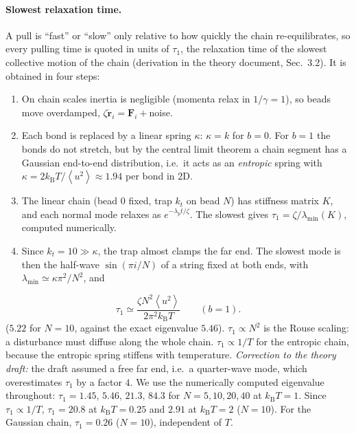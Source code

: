 \documentclass[11pt,a4paper]{article}
\newcommand{\kT}{k_{\mathrm B}T}
\newcommand{\avg}[1]{\left\langle #1\right\rangle}
\begin{document}
\paragraph{Slowest relaxation time.} A pull is ``fast'' or ``slow'' only relative to how quickly
the chain re-equilibrates, so every pulling time is quoted in units of $\tau_1$, the relaxation
time of the slowest collective motion of the chain (derivation in the theory document, Sec.~3.2).
It is obtained in four steps:
\begin{enumerate}[leftmargin=*,itemsep=0pt]
\item On chain scales inertia is negligible (momenta relax in $1/\gamma=1$), so beads move overdamped,
$\zeta\dot{\bm r}_i=\bm F_i+$noise.
\item Each bond is replaced by a linear spring $\kappa$: $\kappa=k$ for $b=0$. For $b=1$ the bonds do not
stretch, but by the central limit theorem a chain segment has a Gaussian end-to-end distribution, i.e.\
it acts as an \emph{entropic} spring with $\kappa=2\kT/\avg{u^2}\approx1.94$ per bond in 2D.
\item The linear chain (bead $0$ fixed, trap $k_t$ on bead $N$) has stiffness matrix $K$, and each normal
mode relaxes as $e^{-\lambda_pt/\zeta}$. The slowest gives $\tau_1=\zeta/\lambda_{\min}(K)$, computed numerically.
\item Since $k_t=10\gg\kappa$, the trap almost clamps the far end. The slowest mode is then the half-wave
$\sin(\pi i/N)$ of a string fixed at both ends, with $\lambda_{\min}\simeq\kappa\pi^2/N^2$, and
\end{enumerate}
\begin{equation}
\tau_1\simeq\frac{\zeta N^2\avg{u^2}}{2\pi^2\kT}\qquad(b=1).
\label{eq:tau1}
\end{equation}
($5.22$ for $N=10$, against the exact eigenvalue $5.46$). $\tau_1\propto N^2$ is the Rouse scaling:
a disturbance must diffuse along the whole chain. $\tau_1\propto1/T$ for the entropic chain, because the entropic
spring stiffens with temperature. \emph{Correction to the theory draft:} the draft assumed a free far end, i.e.\ a quarter-wave
mode, which overestimates $\tau_1$ by a factor $4$. We use the numerically computed
eigenvalue throughout: $\tau_1=1.45,\,5.46,\,21.3,\,84.3$ for $N=5,10,20,40$ at $\kT=1$.
Since $\tau_1\propto1/T$, $\tau_1=20.8$ at $\kT=0.25$ and $2.91$ at $\kT=2$ ($N=10$). For
the Gaussian chain, $\tau_1=0.26$ ($N=10$), independent of $T$.

\end{document}
